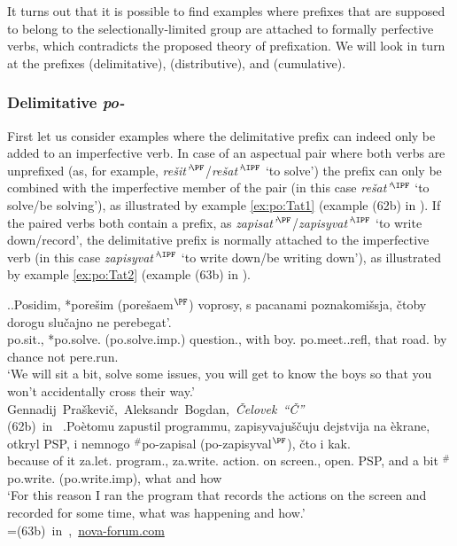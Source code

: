 It turns out that it is possible to find examples where prefixes that are supposed to belong to the selectionally-limited group are attached to formally perfective verbs, which contradicts the proposed theory of prefixation. We will look in turn at the prefixes  (delimitative),  (distributive), and  (cumulative). 

\subsubsection{Delimitative \textit{po-}}
First let us consider examples where the delimitative prefix  can indeed only be added to an imperfective verb. In case of an aspectual pair where both verbs are unprefixed (as, for example, \textit{re\v{s}it'}$^{\PF}$\slash\textit{re\v{s}at'}$^{\IPF}$ `to solve') the prefix  can only be combined with the imperfective member of the pair (in this case \textit{re\v{s}at'}$^{\IPF}$ `to solve/be solving'), as illustrated by example \ref{ex:po:Tat1} (example (62b) in \citealt[121]{Tatevosov:09}). If the paired verbs both contain a prefix, as \textit{zapisat'}$^{\PF}$\slash\textit{zapisyvat'}$^{\IPF}$ `to write down/record', the delimitative prefix  is normally attached to the imperfective verb (in this case \textit{zapisyvat'}$^{\IPF}$ `to write down/be writing down'), as illustrated by example \ref{ex:po:Tat2} (example (63b) in \citealt[121]{Tatevosov:09}).

\ex.\label{ex:po:Tat}\ag.\label{ex:po:Tat1}Posidim, *pore\v{s}im (\textsuperscript{\JudgeOK}pore\v{s}aem$^{\PF}$) voprosy, s pacanami poznakomi\v{s}sja, \v{c}toby dorogu slu\v{c}ajno ne perebegat'.\\
po.sit., *po.solve. (\textsuperscript{\JudgeOK}po.solve.imp.) question., with boy. po.meet..refl, that road. {by chance} not pere.run.\\
\trans `We will sit a bit, solve some issues, you will get to know the boys so that you won't accidentally cross their way.'\\\hbox{}\hfill\hbox{Gennadij Pra\v{s}kevi\v{c}, Aleksandr Bogdan, \textit{\v{C}elovek ``\v{C}''}}\\\hbox{}\hfill\hbox{(62b) in \citet{Tatevosov:09}}
\bg.\label{ex:po:Tat2}Po\`{e}tomu zapustil programmu, zapisyvaju\v{s}\v{c}uju dejstvija na \`{e}krane, otkryl PSP, i nemnogo $^\#$po-zapisal (\textsuperscript{\JudgeOK}po-zapisyval$^{\PF}$), \v{c}to i kak.\\
{because of it} za.let. program., za.write. action. on screen., open. PSP, and {a bit} $^\#$po.write. (\textsuperscript{\JudgeOK}po.write.imp), what and how\\
\trans `For this reason I ran the program that records the actions on the screen and recorded for some time, what was happening and how.'\\\hbox{}\hfill\hbox{=(63b) in \citet{Tatevosov:09}, \url{nova-forum.com}}

